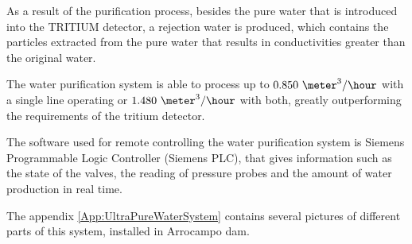 As a result of the purification process, besides the pure water that is introduced into the TRITIUM detector, a rejection water is produced,  which contains the particles extracted from the pure water that results in conductivities greater than the original water.

The water purification system is able to process up to $0.850~\meter^3/\hour$ with a single line operating or $1.480~\meter^3/\hour$ with both, greatly outperforming the requirements of the tritium detector. 

The software used for remote controlling the water purification system is Siemens Programmable Logic Controller (Siemens PLC), that gives information such as the state of the valves, the reading of pressure probes and the amount of water production in real time. 

The appendix \ref{App:UltraPureWaterSystem} contains several pictures of different parts of this system, installed in Arrocampo dam.